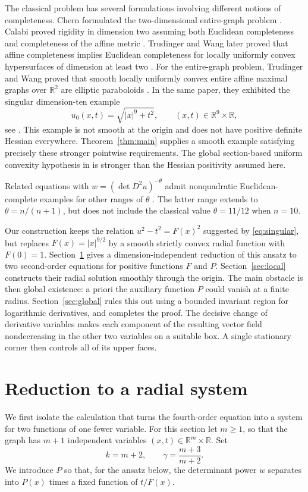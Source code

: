 \documentclass[11pt]{article}
\newcommand{\R}{\mathbb R}
\theoremstyle{remark}
\begin{document}
The classical problem has several formulations involving different
notions of completeness.  Chern formulated the two-dimensional
entire-graph problem \cite{Chern1979}.  Calabi proved rigidity in
dimension two assuming both Euclidean completeness and completeness
of the affine metric \cite{Calabi1982}.  Trudinger and Wang later
proved that affine completeness implies Euclidean completeness for
locally uniformly convex hypersurfaces of dimension at least two
\cite{TrudingerWang2002}.
For the entire-graph problem, Trudinger and Wang proved that smooth
locally uniformly convex entire affine maximal graphs over $\R^2$
are elliptic paraboloids \cite{TrudingerWang2000}.  In the same paper,
they exhibited the singular dimension-ten example
\begin{equation}\label{eq:singular}
 u_0(x,t)=\sqrt{|x|^9+t^2},\qquad (x,t)\in\R^9\times\R,
\end{equation}
see \cite[Section~7]{TrudingerWang2000}.  This example is not smooth
at the origin and does not have positive definite Hessian everywhere.
Theorem~\ref{thm:main} supplies a smooth example satisfying precisely
these stronger pointwise requirements.  The global section-based
uniform convexity hypothesis in
\cite[Corollary~4.3]{TrudingerWang2000} is stronger than the Hessian
positivity assumed here.

Related equations with $w=(\det D^2u)^{-\theta}$ admit nonquadratic
Euclidean-complete examples for other ranges of $\theta$
\cite{Du2024,SunXingXu2026}.  The latter range extends to
$\theta=n/(n+1)$, but does not include the classical value
$\theta=11/12$ when $n=10$.

Our construction keeps the relation $u^2-t^2=F(x)^2$ suggested by
\eqref{eq:singular}, but replaces $F(x)=|x|^{9/2}$ by a smooth
strictly convex radial function with $F(0)=1$.
Section~\ref{sec:reduction} gives a dimension-independent reduction
of this ansatz to two second-order equations for positive functions
$F$ and $P$.  Section~\ref{sec:local} constructs their radial solution
smoothly through the origin.  The main obstacle is then global
existence: a priori the auxiliary function $P$ could vanish at a
finite radius.  Section~\ref{sec:global} rules this out using a bounded
invariant region for logarithmic derivatives, and completes the
proof.  The decisive change of derivative variables makes each
component of the resulting vector field nondecreasing in the other
two variables on a suitable box.  A single stationary corner then
controls all of its upper faces.

\section{Reduction to a radial system}\label{sec:reduction}
We first isolate the calculation that turns the fourth-order
equation into a system for two functions of one fewer variable.
For this section let $m\geq1$, so that the graph has $m+1$
independent variables $(x,t)\in\R^m\times\R$.  Set
\[
 k=m+2,\qquad \gamma=\frac{m+3}{m+2}.
\]
We introduce $P$ so that, for the ansatz below, the determinant power
$w$ separates into $P(x)$ times a fixed function of $t/F(x)$.
\end{document}
